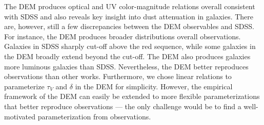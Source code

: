 

The DEM produces optical and UV color-magnitude relations overall consistent
with SDSS and also reveals key insight into dust attenuation in galaxies. There
are, however, still a few discrepancies between the DEM observables and SDSS.
For instance, the DEM produces broader distributions overall observations.
Galaxies in SDSS sharply cut-off above the red sequence, while some galaxies in
the DEM broadly extend beyond the cut-off. The DEM also produces galaxies 
more luminous galaxies than SDSS. Nevertheless, the DEM better reproduces
observations than other works. Furthermore, we chose linear relations to
parameterize $\tau_V$ and $\delta$ in the DEM for simplicity. However, the
empirical framework of the DEM can easily be extended to more flexible
parameterizations that better reproduce observations --- the only challenge
would be to find a well-motivated parameterization from observations.

